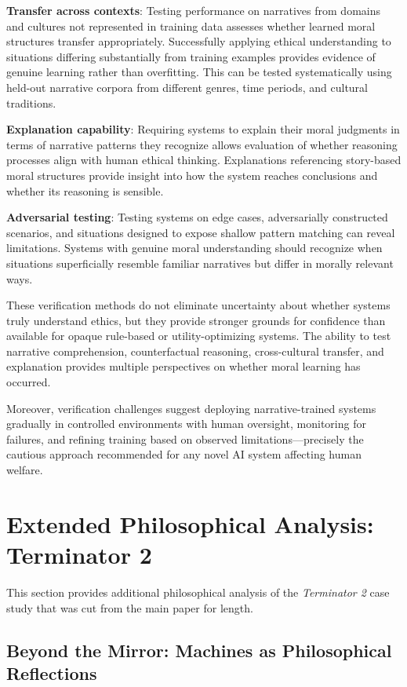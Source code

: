 \documentclass[12pt]{article}
\begin{document}
\textbf{Transfer across contexts}: Testing performance on narratives from domains and cultures not represented in training data assesses whether learned moral structures transfer appropriately. Successfully applying ethical understanding to situations differing substantially from training examples provides evidence of genuine learning rather than overfitting. This can be tested systematically using held-out narrative corpora from different genres, time periods, and cultural traditions.

\textbf{Explanation capability}: Requiring systems to explain their moral judgments in terms of narrative patterns they recognize allows evaluation of whether reasoning processes align with human ethical thinking. Explanations referencing story-based moral structures provide insight into how the system reaches conclusions and whether its reasoning is sensible.

\textbf{Adversarial testing}: Testing systems on edge cases, adversarially constructed scenarios, and situations designed to expose shallow pattern matching can reveal limitations. Systems with genuine moral understanding should recognize when situations superficially resemble familiar narratives but differ in morally relevant ways.

These verification methods do not eliminate uncertainty about whether systems truly understand ethics, but they provide stronger grounds for confidence than available for opaque rule-based or utility-optimizing systems. The ability to test narrative comprehension, counterfactual reasoning, cross-cultural transfer, and explanation provides multiple perspectives on whether moral learning has occurred.

Moreover, verification challenges suggest deploying narrative-trained systems gradually in controlled environments with human oversight, monitoring for failures, and refining training based on observed limitations---precisely the cautious approach recommended for any novel AI system affecting human welfare.

\section{Extended Philosophical Analysis: Terminator 2}

This section provides additional philosophical analysis of the \textit{Terminator 2} case study that was cut from the main paper for length.

\subsection{Beyond the Mirror: Machines as Philosophical Reflections}
\end{document}
